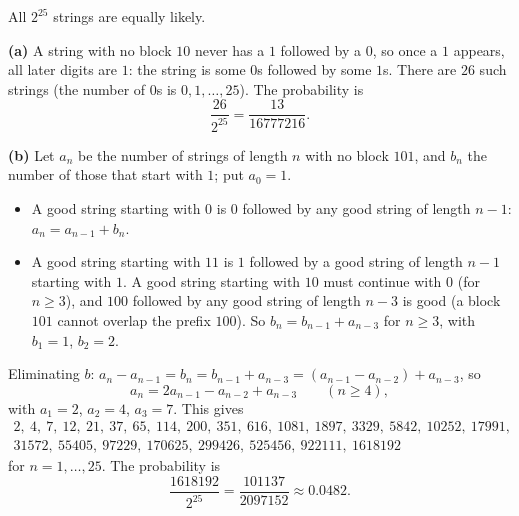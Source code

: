 All $2^{25}$ strings are equally likely.

\textbf{(a)} A string with no block $10$ never has a $1$ followed by a $0$, so once a $1$ appears, all later digits are $1$: the string is some $0$s followed by some $1$s. There are $26$ such strings (the number of $0$s is $0,1,\ldots,25$). The probability is
\[\dfrac{26}{2^{25}}=\boxed{\dfrac{13}{16777216}}.\]

\textbf{(b)} Let $a_n$ be the number of strings of length $n$ with no block $101$, and $b_n$ the number of those that start with $1$; put $a_0=1$.
\begin{itemize}
\item A good string starting with $0$ is $0$ followed by any good string of length $n-1$: $a_n=a_{n-1}+b_n$.
\item A good string starting with $11$ is $1$ followed by a good string of length $n-1$ starting with $1$. A good string starting with $10$ must continue with $0$ (for $n\ge3$), and $100$ followed by any good string of length $n-3$ is good (a block $101$ cannot overlap the prefix $100$). So $b_n=b_{n-1}+a_{n-3}$ for $n\ge3$, with $b_1=1$, $b_2=2$.
\end{itemize}
Eliminating $b$: $a_n-a_{n-1}=b_n=b_{n-1}+a_{n-3}=(a_{n-1}-a_{n-2})+a_{n-3}$, so
\[a_n=2a_{n-1}-a_{n-2}+a_{n-3}\qquad(n\ge4),\]
with $a_1=2$, $a_2=4$, $a_3=7$. This gives
\[\begin{array}{l}
2,\ 4,\ 7,\ 12,\ 21,\ 37,\ 65,\ 114,\ 200,\ 351,\ 616,\ 1081,\ 1897,\ 3329,\ 5842,\ 10252,\ 17991,\\
31572,\ 55405,\ 97229,\ 170625,\ 299426,\ 525456,\ 922111,\ 1618192
\end{array}\]
for $n=1,\ldots,25$. The probability is
\[\dfrac{1618192}{2^{25}}=\boxed{\dfrac{101137}{2097152}}\approx0.0482.\]
